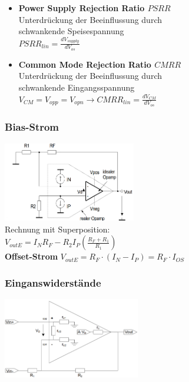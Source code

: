 \documentclass[margin=normal]{tex/hsrzf}
\begin{document}
\begin{minipage}{0.49\textwidth}
  \begin{itemize}
    \item \textbf{Power Supply Rejection Ratio $PSRR$}
          \\ Unterdrückung der Beeinflussung durch \\ schwankende Speisespannung
          \\ $PSRR_{lin} = \frac{dV_{supply}}{dV_{os}}$
    \item \textbf{Common Mode Rejection Ratio $CMRR$}
          \\ Unterdrückung der Beeinflussung durch \\ schwankende Eingangsspannung
          \\ $V_{CM} = V_{opp} = V_{opn} \rightarrow CMRR_{lin} = \frac{dV_{CM}}{dV_{os}}$
  \end{itemize}
  \subsubsection*{Bias-Strom}
  \includegraphics[height=3.5cm]{img/OpAmp/Fehler_Eingangsstrom.png}
  \\ \tiny{Rechnung mit Superposition:}\\
  $V_{out E} = I_NR_F-R_2I_P(\frac{R_F+R_1}{R_1}) $\\
  \textbf{Offset-Strom}
  $V_{out E} = R_F\cdot(I_N-I_P) = R_F\cdot I_{OS}$
  \subsubsection*{Einganswiderstände}
  \includegraphics[height=3.5cm]{img/OpAmp/Fehler_Eingangswiderstand.png}\\
\end{minipage}
\end{document}
